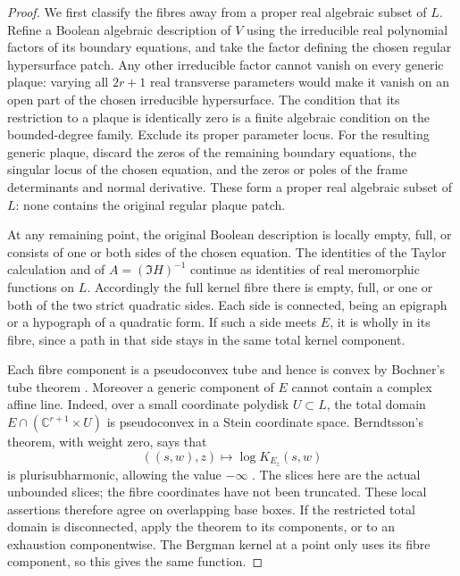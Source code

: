 \begin{proof}
We first classify the fibres away from a proper real algebraic subset of $L$.  Refine a Boolean algebraic description of $V$ using the irreducible real polynomial factors of its boundary equations, and take the factor defining the chosen regular hypersurface patch. Any other irreducible factor cannot vanish on every generic plaque: varying all $2r+1$ real transverse parameters would make it vanish on an open part of the chosen irreducible hypersurface.  The condition that its restriction to a plaque is identically zero is a finite algebraic condition on the bounded-degree family.  Exclude its proper parameter locus.  For the resulting generic plaque, discard the zeros of the remaining boundary equations, the singular locus of the chosen equation, and the zeros or poles of the frame determinants and normal derivative.  These form a proper real algebraic subset of $L$: none contains the original regular plaque patch.

At any remaining point, the original Boolean description is locally empty, full, or consists of one or both sides of the chosen equation. The identities of the Taylor calculation and of $A=(\Im H)^{-1}$ continue as identities of real meromorphic functions on $L$. Accordingly the full kernel fibre there is empty, full, or one or both of the two strict quadratic sides.  Each side is connected, being an epigraph or a hypograph of a quadratic form.  If such a side meets $E$, it is wholly in its fibre, since a path in that side stays in the same total kernel component.

Each fibre component is a pseudoconvex tube and hence is convex by Bochner's tube theorem \cite[Theorem~1.1]{Noguchi2020}.  Moreover a generic component of $E$ cannot contain a complex affine line.  Indeed, over a small coordinate polydisk $U\subset L$, the total domain $E\cap(\mathbb{C}^{r+1}\times U)$ is pseudoconvex in a Stein coordinate space.  Berndtsson's theorem, with weight zero, says that
\[
                 ((s,w),z)\longmapsto\log K_{E_z}(s,w)
\]
is plurisubharmonic, allowing the value $-\infty$ \cite[Theorem~1.1]{Berndtsson2006}.  The slices here are the actual unbounded slices; the fibre coordinates have not been truncated. These local assertions therefore agree on overlapping base boxes. If the restricted total domain is disconnected, apply the theorem to its components, or to an exhaustion componentwise.  The Bergman kernel at a point only uses its fibre component, so this gives the same function.


\end{proof}
